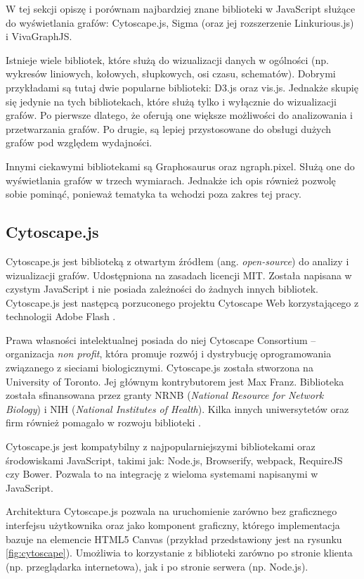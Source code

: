 W tej sekcji opiszę i porównam najbardziej znane biblioteki w JavaScript służące do wyświetlania grafów: Cytoscape.js, Sigma (oraz jej rozszerzenie Linkurious.js) i VivaGraphJS. 

Istnieje wiele bibliotek, które służą do wizualizacji danych w ogólności (np. wykresów liniowych, kołowych, słupkowych, osi czasu, schematów). Dobrymi przykładami są tutaj dwie popularne biblioteki: D3.js oraz vis.js. Jednakże skupię się jedynie na tych bibliotekach, które służą tylko i wyłącznie do wizualizacji grafów. Po pierwsze dlatego, że oferują one większe możliwości do analizowania i przetwarzania grafów. Po drugie, są lepiej przystosowane do obsługi dużych grafów pod względem wydajności. 

Innymi ciekawymi bibliotekami są Graphosaurus oraz ngraph.pixel. Służą one do wyświetlania grafów w trzech wymiarach. Jednakże ich opis również pozwolę sobie pominąć, ponieważ tematyka ta wchodzi poza zakres tej pracy.

\subsection{Cytoscape.js}

Cytoscape.js jest biblioteką z otwartym źródłem (ang. \textit{open-source}) do analizy i wizualizacji grafów. Udostępniona na zasadach licencji MIT. Została napisana w czystym JavaScript i nie posiada zależności do żadnych innych bibliotek. Cytoscape.js jest następcą porzuconego projektu Cytoscape Web korzystającego z technologii Adobe Flash \cite[309]{franz}. 

Prawa własności intelektualnej posiada do niej Cytoscape Consortium -- organizacja \textit{non profit}, która promuje rozwój i dystrybucję oprogramowania związanego z sieciami biologicznymi. Cytoscape.js została stworzona na University of Toronto. Jej głównym kontrybutorem jest Max Franz. Biblioteka została sfinansowana przez granty NRNB (\textit{National Resource for Network Biology}) i NIH (\textit{National Institutes of Health}). Kilka innych uniwersytetów oraz firm również pomagało w rozwoju biblioteki \cite{cytoscape}. 

Cytoscape.js jest kompatybilny z najpopularniejszymi bibliotekami oraz środowiskami JavaScript, takimi jak: Node.js, Browserify, webpack, RequireJS czy Bower. Pozwala to na integrację z wieloma systemami napisanymi w JavaScript. 

Architektura Cytoscape.js pozwala na uruchomienie zarówno bez graficznego interfejsu użytkownika oraz jako komponent graficzny, którego implementacja bazuje na elemencie HTML5 Canvas (przykład przedstawiony jest na rysunku \ref{fig:cytoscape}). Umożliwia to korzystanie z biblioteki zarówno po stronie klienta (np. przeglądarka internetowa), jak i po stronie serwera (np. Node.js).

